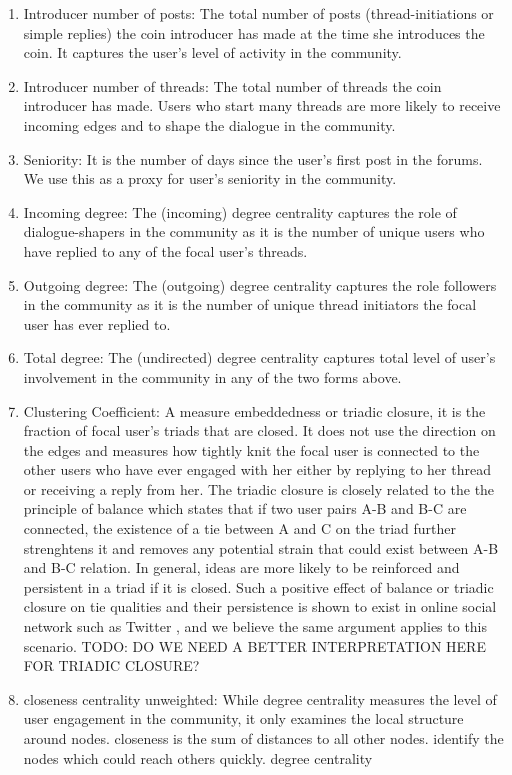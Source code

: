 \begin{enumerate}[topsep=0pt,itemsep=-0.5ex,partopsep=1ex,parsep=1ex]
  \item{Introducer number of posts:} The total number of posts (thread-initiations or simple replies) the coin introducer has made at the time she introduces the coin. It captures the user's level of activity in the community.
  \item{Introducer number of threads:} The total number of threads the coin introducer has made. Users who start many threads are more likely to receive incoming edges and to shape the dialogue in the community.
  \item{Seniority:} It is the number of days since the user's first post in the forums. We use this as a proxy for user's seniority in the community.
  \item{Incoming degree:} The (incoming) degree centrality captures the role of dialogue-shapers in the community as it is the number of unique users who have replied to any of the focal user's threads.
  \item{Outgoing degree:} The (outgoing) degree centrality captures the role followers in the community as it is the number of unique thread initiators the focal user has ever replied to.
  \item{Total degree:} The (undirected) degree centrality captures total level of user's involvement in the community in any of the two forms above.
  \item{Clustering Coefficient:} A measure embeddedness or triadic closure, it is the fraction of focal user's triads that are closed. It does not use the direction on the edges and measures how tightly knit the focal user is connected to the other users who have ever engaged with her either by replying to her thread or receiving a reply from her. The triadic closure is closely related to the the principle of balance which states that if two user pairs A-B and B-C are connected, the existence of a tie between A and C on the triad further strenghtens it and removes any potential strain that could exist between A-B and B-C relation. In general, ideas are more likely to be reinforced and persistent in a triad if it is closed. Such a positive effect of balance or triadic closure on tie qualities and their persistence is shown to exist in online social network such as Twitter \cite{KleinbergBalance}, and we believe the same argument applies to this scenario.
  TODO: DO WE NEED A BETTER INTERPRETATION HERE FOR TRIADIC CLOSURE?
  \item{closeness centrality unweighted:} While degree centrality measures the level of user engagement in the community, it only examines the local structure around nodes. closeness  is the sum of distances to all other nodes. identify the nodes which could reach others quickly. degree centrality 

\end{enumerate}
